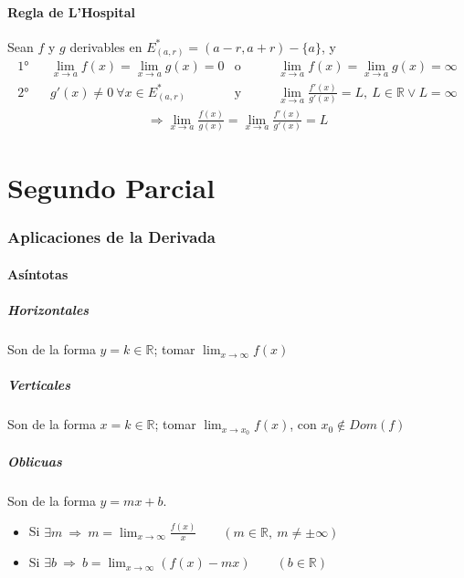 \documentclass[11pt,titlepage]{article}
\newcommand{\commLim}[2]{\lim_{#1 \to #2}}
\newcommand{\displayLim}[2]{\displaystyle \commLim{#1}{#2}}
\begin{document}
\subsection{Regla de L'Hospital}
Sean $f$ y $g$ derivables en $E^{*}_{(a,r)} = (a - r, a + r) - \{a\}$, y
\begin{align*}
	\text{1°}& \ \ \ \ \commLim{x}{a} f(x) = \commLim{x}{a} g(x) = 0 &\text{o} \qquad &\commLim{x}{a} f(x) = 
	\commLim{x}{a} g(x) = \infty \\
	\text{2°}& \ \ \ \ g'(x) \neq 0 \ \forall x \in E^{*}_{(a,r)} &\text{y} \qquad &\commLim{x}{a} \frac{f'(x)}{g'(x)} = L, \ L \in
	\mathbb{R} \lor L = \infty
\end{align*}
\begin{gather*}
	\Rightarrow \commLim{x}{a} \frac{f(x)}{g(x)} = \commLim{x}{a} \frac{f'(x)}{g'(x)} = L
\end{gather*}


\newpage
\part{Segundo Parcial}

\section{Aplicaciones de la Derivada}
\subsection{Asíntotas}
\subsubsection{Horizontales}
Son de la forma $y = k \in \mathbb{R}$; tomar $\displayLim{x}{\infty} f(x)$

\subsubsection{Verticales}
Son de la forma $x = k \in \mathbb{R}$; tomar $\displayLim{x}{x_0} f(x)$, con $x_0 \notin Dom(f)$

\subsubsection{Oblicuas}
Son de la forma $y = mx + b$.
\begin{itemize}
	\item Si $\exists m \ \Rightarrow \ m = \displayLim{x}{\infty} \frac{f(x)}{x} \qquad (m \in \mathbb{R}, \ m \neq \pm \infty)$
	\item Si $\exists b \ \Rightarrow \ b = \displayLim{x}{\infty} (f(x) - mx) \qquad (b \in \mathbb{R})$
\end{itemize}
\end{document}
